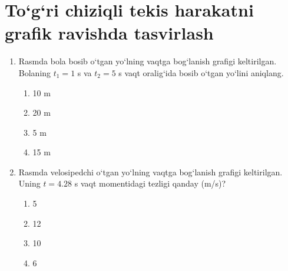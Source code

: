 
\section{To‘g‘ri chiziqli tekis harakatni grafik ravishda tasvirlash}

\begin{enumerate}

\item Rasmda bola bosib o‘tgan yo‘lning vaqtga bog‘lanish grafigi keltirilgan. 
Bolaning $t_1=1$ s va $t_2=5$ s vaqt oralig‘ida bosib o‘tgan yo‘lini aniqlang.




\begin{enumerate}[label=\Alph*)]
\item 10 m
\item 20 m
\item 5 m
\item 15 m
\end{enumerate}

\item Rasmda velosipedchi o‘tgan yo‘lning vaqtga bog‘lanish grafigi keltirilgan. 
Uning $t=4.28$ s vaqt momentidagi tezligi qanday (m/s)?




\begin{enumerate}[label=\Alph*)]
\item 5
\item 12
\item 10
\item 6

\end{enumerate}


\end{enumerate}
